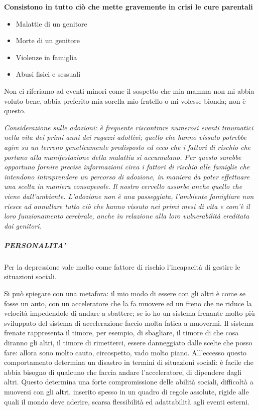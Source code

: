 \textbf{Consistono in tutto ciò che mette gravemente in crisi le cure
parentali}

\begin{itemize}
\item
  Malattie di un genitore
\item
  Morte di un genitore
\item
  Violenze in famiglia
\item
  Abusi fisici e sessuali
\end{itemize}

Non ci riferiamo ad eventi minori come il sospetto che mia mamma non mi
abbia voluto bene, abbia preferito mia sorella mio fratello o mi volesse
bionda; non è questo.

\emph{Considerazione sulle adozioni: è frequente riscontrare numerosi
eventi traumatici nella vita dei primi anni dei ragazzi adottivi; quello
che hanno vissuto potrebbe agire su un terreno geneticamente predisposto
ed ecco che i fattori di rischio che portano alla manifestazione della
malattia si accumulano. Per questo sarebbe opportuno fornire precise
informazioni circa i fattori di rischio alle famiglie che intendono
intraprendere un percorso di adozione, in maniera da poter effettuare
una scelta in maniera consapevole}. \emph{Il nostro cervello assorbe
anche quello che viene dall'ambiente. L'adozione non è una passeggiata,
l'ambiente famigliare non riesce ad annullare tutto ciò che hanno
vissuto nei primi mesi di vita e com'è il loro funzionamento cerebrale,
anche in relazione alla loro vulnerabilità ereditata dai genitori.}

\subparagraph{PERSONALITA'}

Per la depressione vale molto come fattore di rischio l'incapacità di
gestire le situazioni sociali.

Si può spiegare con una metafora: il mio modo di essere con gli altri è
come se fosse un auto, con un acceleratore che la fa muovere ed un freno
che ne riduce la velocità impedendole di andare a sbattere; se io ho un
sistema frenante molto più sviluppato del sistema di accelerazione
faccio molta fatica a muovermi. Il sistema frenate rappresenta il
timore, per esempio, di sbagliare, il timore di che cosa diranno gli
altri, il timore di rimetterci, essere danneggiato dalle scelte che
posso fare: allora sono molto cauto, circospetto, vado molto piano.
All'eccesso questo comportamento determina un disastro in termini di
situazioni sociali: è facile che abbia bisogno di qualcuno che faccia
andare l'acceleratore, di dipendere dagli altri. Questo determina una
forte compromissione delle abilità sociali, difficoltà a muoversi con
gli altri, inserito spesso in un quadro di regole assolute, rigide alle
quali il mondo deve aderire, scarsa flessibilità ed adattabilità agli
eventi esterni.

